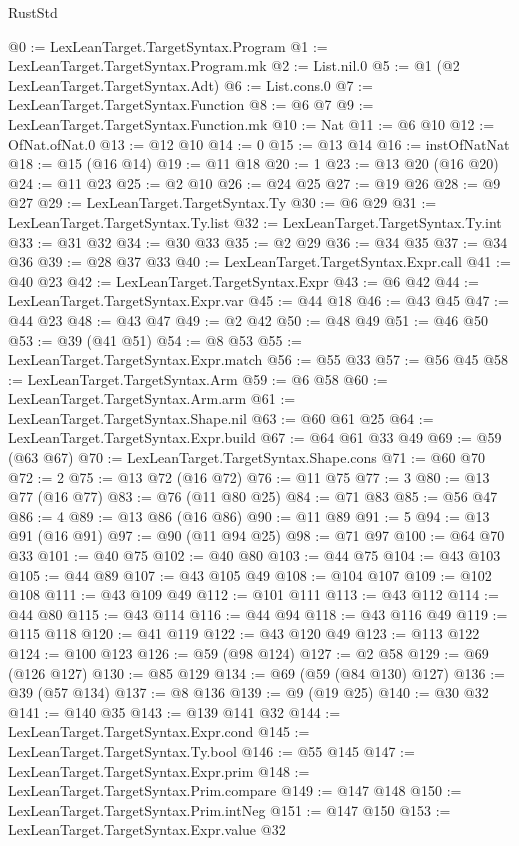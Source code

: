 \begin{lexlean}{RustStd}
\begin{coremodule}
{\begin{coremodule}
{{{{{{{{@0 := LexLeanTarget.TargetSyntax.Program
@1 := LexLeanTarget.TargetSyntax.Program.mk
@2 := List.nil.{0}
@5 := @1 (@2 LexLeanTarget.TargetSyntax.Adt)
@6 := List.cons.{0}
@7 := LexLeanTarget.TargetSyntax.Function
@8 := @6 @7
@9 := LexLeanTarget.TargetSyntax.Function.mk
@10 := Nat
@11 := @6 @10
@12 := OfNat.ofNat.{0}
@13 := @12 @10
@14 := 0
@15 := @13 @14
@16 := instOfNatNat
@18 := @15 (@16 @14)
@19 := @11 @18
@20 := 1
@23 := @13 @20 (@16 @20)
@24 := @11 @23
@25 := @2 @10
@26 := @24 @25
@27 := @19 @26
@28 := @9 @27
@29 := LexLeanTarget.TargetSyntax.Ty
@30 := @6 @29
@31 := LexLeanTarget.TargetSyntax.Ty.list
@32 := LexLeanTarget.TargetSyntax.Ty.int
@33 := @31 @32
@34 := @30 @33
@35 := @2 @29
@36 := @34 @35
@37 := @34 @36
@39 := @28 @37 @33
@40 := LexLeanTarget.TargetSyntax.Expr.call
@41 := @40 @23
@42 := LexLeanTarget.TargetSyntax.Expr
@43 := @6 @42
@44 := LexLeanTarget.TargetSyntax.Expr.var
@45 := @44 @18
@46 := @43 @45
@47 := @44 @23
@48 := @43 @47
@49 := @2 @42
@50 := @48 @49
@51 := @46 @50
@53 := @39 (@41 @51)
@54 := @8 @53
@55 := LexLeanTarget.TargetSyntax.Expr.match
@56 := @55 @33
@57 := @56 @45
@58 := LexLeanTarget.TargetSyntax.Arm
@59 := @6 @58
@60 := LexLeanTarget.TargetSyntax.Arm.arm
@61 := LexLeanTarget.TargetSyntax.Shape.nil
@63 := @60 @61 @25
@64 := LexLeanTarget.TargetSyntax.Expr.build
@67 := @64 @61 @33 @49
@69 := @59 (@63 @67)
@70 := LexLeanTarget.TargetSyntax.Shape.cons
@71 := @60 @70
@72 := 2
@75 := @13 @72 (@16 @72)
@76 := @11 @75
@77 := 3
@80 := @13 @77 (@16 @77)
@83 := @76 (@11 @80 @25)
@84 := @71 @83
@85 := @56 @47
@86 := 4
@89 := @13 @86 (@16 @86)
@90 := @11 @89
@91 := 5
@94 := @13 @91 (@16 @91)
@97 := @90 (@11 @94 @25)
@98 := @71 @97
@100 := @64 @70 @33
@101 := @40 @75
@102 := @40 @80
@103 := @44 @75
@104 := @43 @103
@105 := @44 @89
@107 := @43 @105 @49
@108 := @104 @107
@109 := @102 @108
@111 := @43 @109 @49
@112 := @101 @111
@113 := @43 @112
@114 := @44 @80
@115 := @43 @114
@116 := @44 @94
@118 := @43 @116 @49
@119 := @115 @118
@120 := @41 @119
@122 := @43 @120 @49
@123 := @113 @122
@124 := @100 @123
@126 := @59 (@98 @124)
@127 := @2 @58
@129 := @69 (@126 @127)
@130 := @85 @129
@134 := @69 (@59 (@84 @130) @127)
@136 := @39 (@57 @134)
@137 := @8 @136
@139 := @9 (@19 @25)
@140 := @30 @32
@141 := @140 @35
@143 := @139 @141 @32
@144 := LexLeanTarget.TargetSyntax.Expr.cond
@145 := LexLeanTarget.TargetSyntax.Ty.bool
@146 := @55 @145
@147 := LexLeanTarget.TargetSyntax.Expr.prim
@148 := LexLeanTarget.TargetSyntax.Prim.compare
@149 := @147 @148
@150 := LexLeanTarget.TargetSyntax.Prim.intNeg
@151 := @147 @150
@153 := LexLeanTarget.TargetSyntax.Expr.value @32
}}}}}}}}
\end{coremodule}}
\end{coremodule}
\end{lexlean}
